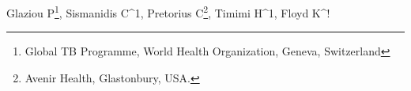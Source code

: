 Glaziou P\footnote{Global TB Programme, World Health Organization, Geneva, Switzerland}, Sismanidis C^1, Pretorius C\footnote{Avenir Health, Glastonbury, USA.}, Timimi H^1, Floyd K^!


